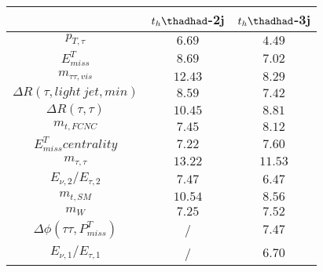 \centering
\begin{tabular}{|c|c|c|} \hline
  & $t_h\thadhad$-2j & $t_h\thadhad$-3j \\\hline
$p_{T,\tau }$ & $6.69$ & $4.49$\\\hline
$E^{T}_{miss}$ & $8.69$ & $7.02$\\\hline
$m_{\tau \tau ,vis}$ & $12.43$ & $8.29$\\\hline
$\Delta R(\tau ,light~jet,min)$ & $8.59$ & $7.42$\\\hline
$\Delta R(\tau ,\tau )$ & $10.45$ & $8.81$\\\hline
$m_{t,FCNC}$ & $7.45$ & $8.12$\\\hline
$E^{T}_{miss} centrality$ & $7.22$ & $7.60$\\\hline
$m_{\tau ,\tau }$ & $13.22$ & $11.53$\\\hline
$E_{\nu,2}/E_{\tau ,2}$ & $7.47$ & $6.47$\\\hline
$m_{t,SM}$ & $10.54$ & $8.56$\\\hline
$m_{W}$ & $7.25$ & $7.52$\\\hline
$\Delta\phi(\tau \tau ,P^{T}_{miss})$ &  / & $7.47$\\\hline
$E_{\nu,1}/E_{\tau ,1}$ &  / & $6.70$\\\hline
\end{tabular}
